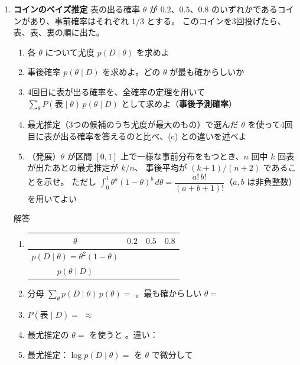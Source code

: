 \documentclass[a4paper,dvipdfmx]{jsarticle}
\newcommand{\提出期限}{2026年11月9日（月）}
\newcommand{\学籍番号}{0000000}
\newcommand{\氏名}{氏名を書く}
\newcommand{\提出日}{2026年11月9日}
\newenvironment{answer}{\begin{itembox}[l]{解答}}{\end{itembox}}
\begin{document}
\begin{enumerate}
  \item \textbf{コインのベイズ推定}\quad
    表の出る確率 $\theta$ が $0.2$、$0.5$、$0.8$ のいずれかであるコインがあり、事前確率はそれぞれ $1/3$ とする。
    このコインを3回投げたら、表、表、裏の順に出た。
    \begin{enumerate}
      \item 各 $\theta$ について尤度 $p(D \mid \theta)$ を求めよ
      \item 事後確率 $p(\theta \mid D)$ を求めよ。どの $\theta$ が最も確からしいか
      \item 4回目に表が出る確率を、全確率の定理を用いて $\sum_\theta P(\text{表} \mid \theta)\,p(\theta \mid D)$ として求めよ（\textbf{事後予測確率}）
      \item 最尤推定（3つの候補のうち尤度が最大のもの）で選んだ $\theta$ を使って4回目に表が出る確率を答えるのと比べ、(c) との違いを述べよ
      \item （発展）$\theta$ が区間 $[0, 1]$ 上で一様な事前分布をもつとき、$n$ 回中 $k$ 回表が出たあとの最尤推定が $k/n$、
        事後平均が $(k + 1)/(n + 2)$ であることを示せ。
        ただし $\int_0^1 \theta^a (1 - \theta)^b\,d\theta = \dfrac{a!\,b!}{(a + b + 1)!}$（$a, b$ は非負整数）を用いてよい
    \end{enumerate}
    \begin{answer}
      \begin{enumerate}
        \item
          \begin{center}
            \begin{tabular}{c|c|c|c}
              $\theta$ & $0.2$ & $0.5$ & $0.8$ \\ \hline
              $p(D \mid \theta) = \theta^2(1 - \theta)$ & \phantom{XXXXXX} & \phantom{XXXXXX} & \phantom{XXXXXX} \\
              $p(\theta \mid D)$ & \phantom{XXXXXX} & \phantom{XXXXXX} & \phantom{XXXXXX}
            \end{tabular}
          \end{center}
        \item 分母 $\sum_\theta p(D \mid \theta)\,p(\theta) = $ \phantom{XXXXXXXX}。最も確からしい $\theta = $ \phantom{XXX}
          \vspace{4mm}
        \item $P(\text{表} \mid D) = $ \phantom{XXXXXXXXXXXXXXXXXXXXXXXX} $\approx$ \phantom{XXXX}
          \vspace{4mm}
        \item 最尤推定の $\theta = $ \phantom{XXX} を使うと \phantom{XXXX}。違い：
          \vspace{10mm}
        \item 最尤推定：$\log p(D \mid \theta) = $ \phantom{XXXXXXXXXXXXXXXX} を $\theta$ で微分して
          \vspace{10mm}


\end{enumerate}
\end{answer}
\end{enumerate}
\end{document}
